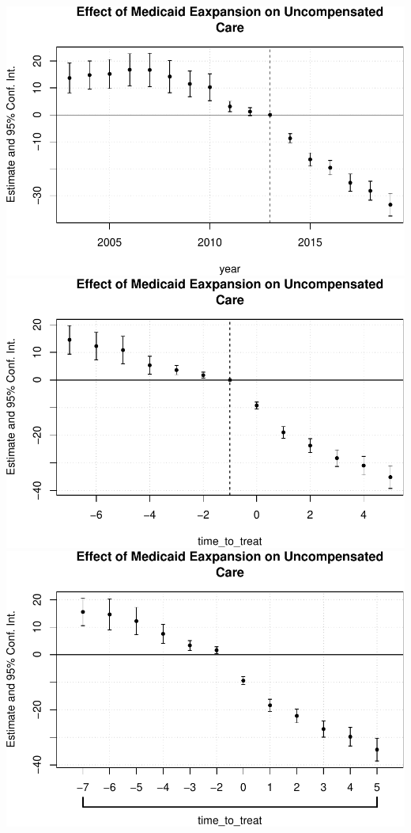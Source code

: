 \documentclass[
  12pt,
]{article}
\begin{document}
\includegraphics{Report_files/figure-latex/Figures-4.pdf}
\includegraphics{Report_files/figure-latex/Figures-5.pdf}
\includegraphics{Report_files/figure-latex/Figures-6.pdf}
\end{document}
